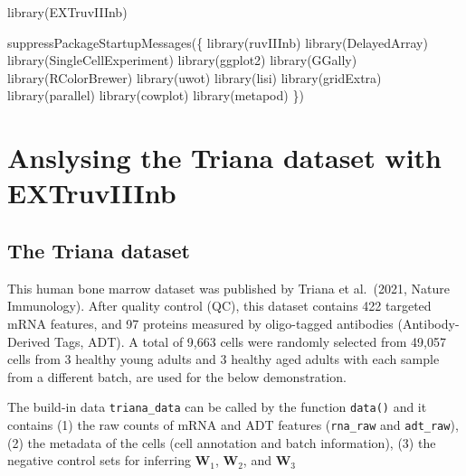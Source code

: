 \documentclass[]{article}
\newcommand{\hlstd}[1]{\textcolor[rgb]{0.251,0.251,0.251}{#1}}%
\newenvironment{Shaded}{\begin{myshaded}}{\end{myshaded}}
\newcommand{\FunctionTok}[1]{\hlstd{#1}}
\newcommand{\NormalTok}[1]{\hlstd{#1}}
\begin{document}
\begin{Shaded}
\begin{Highlighting}[]
\FunctionTok{library}\NormalTok{(EXTruvIIInb)}

\FunctionTok{suppressPackageStartupMessages}\NormalTok{(\{}
    \FunctionTok{library}\NormalTok{(ruvIIInb)}
    \FunctionTok{library}\NormalTok{(DelayedArray)}
    \FunctionTok{library}\NormalTok{(SingleCellExperiment)}
    \FunctionTok{library}\NormalTok{(ggplot2)}
    \FunctionTok{library}\NormalTok{(GGally)}
    \FunctionTok{library}\NormalTok{(RColorBrewer)}
    \FunctionTok{library}\NormalTok{(uwot)}
    \FunctionTok{library}\NormalTok{(lisi)}
    \FunctionTok{library}\NormalTok{(gridExtra)}
    \FunctionTok{library}\NormalTok{(parallel)}
    \FunctionTok{library}\NormalTok{(cowplot)}
    \FunctionTok{library}\NormalTok{(metapod)}
\NormalTok{\})}
\end{Highlighting}
\end{Shaded}

\section{Anslysing the Triana dataset with EXTruvIIInb}\label{anslysing-the-triana-dataset-with-extruviiinb}

\subsection{The Triana dataset}\label{the-triana-dataset}

This human bone marrow dataset was published by Triana et al.~(2021, Nature Immunology). After quality control (QC), this dataset contains 422 targeted mRNA features, and 97 proteins measured by oligo-tagged antibodies (Antibody-Derived Tags, ADT). A total of 9,663 cells were randomly selected from 49,057 cells from 3 healthy young adults and 3 healthy aged adults with each sample from a different batch, are used for the below demonstration.

The build-in data \texttt{triana\_data} can be called by the function \texttt{data()} and it contains (1) the raw counts of mRNA and ADT features (\texttt{rna\_raw} and \texttt{adt\_raw}), (2) the metadata of the cells (cell annotation and batch information), (3) the negative control sets for inferring \({\boldsymbol W_1}\), \({\boldsymbol W_2}\), and \({\boldsymbol W_3}\)
\end{document}
